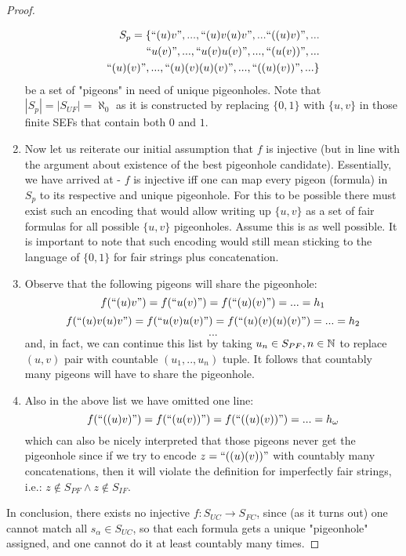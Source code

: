 \begin{proof}
\begin{enumerate}[label=(\roman*)]
\begin{equation*}
      \begin{aligned}
      S_p = \{ 
        \text{``} (u)v \text{''},...,\text{``} (u)v(u)v \text{''}, ... \text{``} ((u)v) \text{''}, ... \\ 
        \text{``} u(v) \text{''},...,\text{``} u(v)u(v) \text{''}, ..., \text{``} (u(v)) \text{''}, ... \\
        \text{``} (u)(v) \text{''},...,\text{``} (u)(v)(u)(v) \text{''}, ..., \text{``} ((u)(v)) \text{''}, ... \} 
      \end{aligned}
    \end{equation*}  
    be a set of "pigeons" in need of unique pigeonholes. Note that $|S_p| = |S_{UF}| = \aleph_0$ as it is constructed by replacing $\{0,1\}$ with $\{u,v\}$ in those finite SEFs that contain both $0$ and $1$.
  \item Now let us reiterate our initial assumption that $f$ is injective (but in line with the argument about existence of the best pigeonhole candidate). Essentially, we have arrived at - $f$ is injective iff one can map every pigeon (formula) in $S_p$ to its respective and unique pigeonhole. For this to be possible there must exist such an encoding that would allow writing up $\{u,v\}$ as a set of fair formulas for all possible $\{u,v\}$ pigeonholes. Assume this is as well possible. It is important to note that such encoding would still mean sticking to the language of $\{0,1\}$ for fair strings plus concatenation.
  \item Observe that the following pigeons will share the pigeonhole:
      \[ f(\text{``} (u)v \text{''}) = f(\text{``} u(v) \text{''}) = f(\text{``} (u)(v) \text{''}) = ... = h_1 \]
      \[ f(\text{``} (u)v(u)v \text{''}) = f(\text{``}  u(v)u(v) \text{''}) = f(\text{``} (u)(v)(u)(v) \text{''}) = ... = h_2 \]
      \[ ... \]
    and, in fact, we can continue this list by taking $u_n \in S_{PF}, n \in \mathbb{N}$ to replace $(u, v)$ pair with countable $(u_1, ..,u_n)$ tuple. It follows that countably many pigeons will have to share the pigeonhole. 
  \item Also in the above list we have omitted one line: 
      \[ f(\text{``} ((u)v) \text{''}) = f(\text{``}  (u(v)) \text{''}) = f(\text{``} ((u)(v)) \text{''}) = ... = h_\omega \]
    which can also be nicely interpreted that those pigeons never get the pigeonhole since if we try to encode $z = \text{``} ((u)(v)) \text{''}$ with countably many concatenations, then it will violate the definition for imperfectly fair strings, i.e.: $z \notin S_{PF} \land z \notin S_{IF}$.
  \end{enumerate}
  In conclusion, there exists no injective $f: S_{UC} \to S_{FC}$, since (as it turns out) one cannot match all $s_\alpha \in S_{UC}$, so that each formula gets a unique "pigeonhole" assigned, and one cannot do it at least countably many times.
\end{proof}

